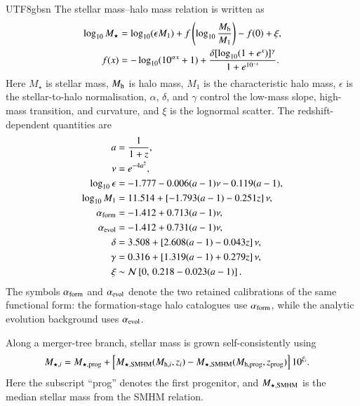 \documentclass[trackchanges, twocolappendix, twocolumn]{aastex701}
\begin{document}
\begin{CJK*}{UTF8}{gbsn}
The stellar mass--halo mass relation is written as
\begin{align}
\log_{10} M_{\star} & = \log_{10} (\epsilon M_1) + f \left( \log_{10} \dfrac{M_{\rm h}}{M_1} \right) - f(0) + \xi , \\
f (x) & = - \log_{10} (10^{\alpha x} + 1) + \dfrac{\delta [\log_{10} (1 + e^x)]^\gamma}{1 + e^{10^{-x}}} .
\end{align}
Here $M_{\star}$ is stellar mass, $M_{\rm h}$ is halo mass, $M_1$ is the characteristic halo mass, $\epsilon$ is the stellar-to-halo normalisation, $\alpha$, $\delta$, and $\gamma$ control the low-mass slope, high-mass transition, and curvature, and $\xi$ is the lognormal scatter. The redshift-dependent quantities are
\begin{align}
a &= \dfrac{1}{1+z},\\
\nu &= e^{-4a^2},\\
\log_{10}\epsilon
&= -1.777 -0.006(a-1)\nu -0.119(a-1),\\
\log_{10}M_1
&= 11.514 + \left[-1.793(a-1)-0.251z\right]\nu,\\
\alpha_{\rm form}
&= -1.412 +0.713(a-1)\nu,\\
\alpha_{\rm evol}
&= -1.412 +0.731(a-1)\nu,\\
\delta
&= 3.508+\left[2.608(a-1)-0.043z\right]\nu,\\
\gamma
&= 0.316+\left[1.319(a-1)+0.279z\right]\nu,\\
\xi &\sim {\cal N}\left[0,\,0.218-0.023(a-1)\right].
\end{align}
The symbols $\alpha_{\rm form}$ and $\alpha_{\rm evol}$ denote the two retained calibrations of the same functional form: the formation-stage halo catalogues use $\alpha_{\rm form}$, while the analytic evolution background uses $\alpha_{\rm evol}$.

Along a merger-tree branch, stellar mass is grown self-consistently using
\begin{align}
M_{\star,i} &=
M_{\star,{\rm prog}}
+\left[
M_{\star,{\rm SMHM}}(M_{{\rm h},i},z_i)
-M_{\star,{\rm SMHM}}(M_{{\rm h},{\rm prog}},z_{\rm prog})
\right]10^{\xi_i}.
\end{align}
Here the subscript ``prog'' denotes the first progenitor, and $M_{\star,{\rm SMHM}}$ is the median stellar mass from the SMHM relation.


\end{CJK*}
\end{document}
